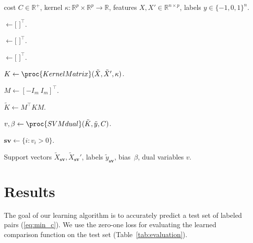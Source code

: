 \documentclass{article}
\newcommand{\SVMcompare}{SVMcompare}
\newcommand{\RR}{\mathbb R}
\begin{document}
\begin{algorithm}[b!]
   \caption{\SVMcompare}
   \label{alg:SVMcompare}
\begin{algorithmic}
   cost $C\in\RR^+$, kernel
  $\kappa:\RR^p\times \RR^p \rightarrow \RR$, features $X,X'\in\RR^{n \times p}$,
  labels $y\in\{-1,0,1\}^n$.

  \STATE {} $\gets [$
  $]^\intercal$.

  \STATE {} $\gets [$
  $]^\intercal$.

  \STATE {} $\gets [$
  $]^\intercal$.

  \STATE $K \gets \proc{KernelMatrix}(\tilde X, \tilde X', \kappa)$.

  \STATE $M \gets [ -I_m\ I_m ]^\intercal$.

  \STATE $\tilde K \gets M^\intercal K M$.

  \STATE $v,\beta \gets \proc{SVMdual}(\tilde K, \tilde y, C)$.



  \STATE $\textbf{sv}\gets\{i: v_i>0\}$.
  
   Support vectors $\tilde
  X_{\textbf{sv}},\tilde X_{\textbf{sv}}'$, labels $\tilde y_{\textbf{sv}}$,
  bias~$\beta$, dual variables $v$.

   \end{algorithmic}
\end{algorithm}

\section{Results}
\label{sec:results}

The goal of our learning algorithm is to accurately predict a test set
of labeled pairs (\ref{eq:min_c}). We use the zero-one loss for
evaluating the learned comparison function on the test set
(Table~\ref{tab:evaluation}).
\end{document}
